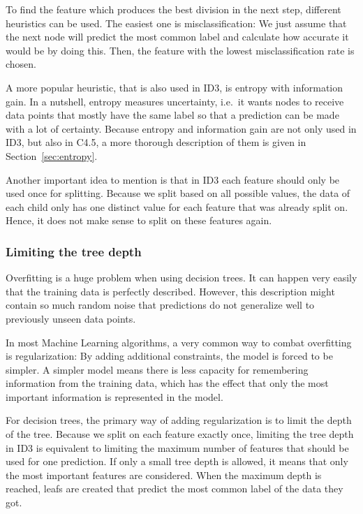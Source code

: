 \documentclass[a4paper]{article}
\begin{document}
To find the feature which produces the best division in the next step, different heuristics can be used. The easiest one is misclassification: We just assume that the next node will predict the most common label and calculate how accurate it would be by doing this. Then, the feature with the lowest misclassification rate is chosen.

A more popular heuristic, that is also used in ID3, is entropy with information gain. In a nutshell, entropy measures uncertainty, i.e.\ it wants nodes to receive data points that mostly have the same label so that a prediction can be made with a lot of certainty. Because entropy and information gain are not only used in ID3, but also in C4.5, a more thorough description of them is given in Section~\ref{sec:entropy}.

Another important idea to mention is that in ID3 each feature should only be used once for splitting. Because we split based on all possible values, the data of each child only has one distinct value for each feature that was already split on. Hence, it does not make sense to split on these features again.

\subsubsection{Limiting the tree depth}
\label{subsec:id3-depth}

Overfitting is a huge problem when using decision trees. It can happen very easily that the training data is perfectly described. However, this description might contain so much random noise that predictions do not generalize well to previously unseen data points.

In most Machine Learning algorithms, a very common way to combat overfitting is regularization: By adding additional constraints, the model is forced to be simpler. A simpler model means there is less capacity for remembering information from the training data, which has the effect that only the most important information is represented in the model.

For decision trees, the primary way of adding regularization is to limit the depth of the tree. Because we split on each feature exactly once, limiting the tree depth in ID3 is equivalent to limiting the maximum number of features that should be used for one prediction. If only a small tree depth is allowed, it means that only the most important features are considered. When the maximum depth is reached, leafs are created that predict the most common label of the data they got.
\end{document}
